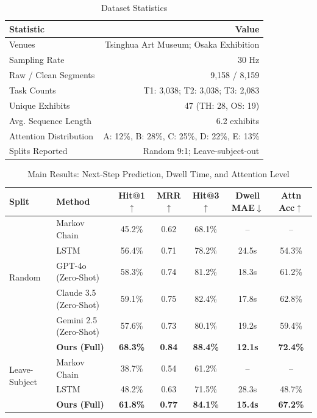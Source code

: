 
\begin{table}[h]
\centering
\caption{Dataset Statistics}
\begin{tabular}{lr}
\toprule
\textbf{Statistic} & \textbf{Value} \\
\midrule
Venues & Tsinghua Art Museum; Osaka Exhibition \\
Sampling Rate & 30 Hz \\
Raw / Clean Segments & 9,158 / 8,159 \\
Task Counts & T1: 3,038; T2: 3,038; T3: 2,083 \\
Unique Exhibits & 47 (TH: 28, OS: 19) \\
Avg. Sequence Length & 6.2 exhibits \\
Attention Distribution & A: 12\%, B: 28\%, C: 25\%, D: 22\%, E: 13\% \\
Splits Reported & Random 9:1; Leave-subject-out \\
\bottomrule
\end{tabular}
\label{tab:dataset}
\end{table}

\begin{table}[h]
\centering
\caption{Main Results: Next-Step Prediction, Dwell Time, and Attention Level}
\begin{tabular}{llccccc}
\toprule
\textbf{Split} & \textbf{Method} & \textbf{Hit@1$\uparrow$} & \textbf{MRR$\uparrow$} & \textbf{Hit@3$\uparrow$} & \textbf{Dwell MAE$\downarrow$} & \textbf{Attn Acc$\uparrow$} \\
\midrule
\multirow{5}{*}{Random}
& Markov Chain & 45.2\% & 0.62 & 68.1\% & -- & -- \\
& LSTM & 56.4\% & 0.71 & 78.2\% & 24.5s & 54.3\% \\
& GPT-4o (Zero-Shot) & 58.3\% & 0.74 & 81.2\% & 18.3s & 61.2\% \\
& Claude 3.5 (Zero-Shot) & 59.1\% & 0.75 & 82.4\% & 17.8s & 62.8\% \\
& Gemini 2.5 (Zero-Shot) & 57.6\% & 0.73 & 80.1\% & 19.2s & 59.4\% \\
\rowcolor{green!10}
& \textbf{Ours (Full)} & \textbf{68.3\%} & \textbf{0.84} & \textbf{88.4\%} & \textbf{12.1s} & \textbf{72.4\%} \\
\midrule
\multirow{2}{*}{Leave-Subject}
& Markov Chain & 38.7\% & 0.54 & 61.2\% & -- & -- \\
& LSTM & 48.2\% & 0.63 & 71.5\% & 28.3s & 48.7\% \\
\rowcolor{green!10}
& \textbf{Ours (Full)} & \textbf{61.8\%} & \textbf{0.77} & \textbf{84.1\%} & \textbf{15.4s} & \textbf{67.2\%} \\
\bottomrule
\end{tabular}
\label{tab:main_results}
\end{table}

